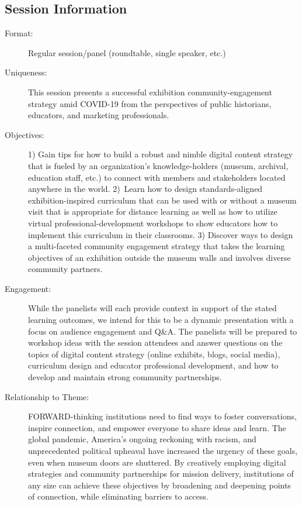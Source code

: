\documentclass{report}
\begin{document}
              \subsection*{Session Information}
                \begin{description}
                  \item [Format:] Regular session/panel (roundtable, single speaker, etc.)
							    
							    \item [Uniqueness:]This session presents a successful exhibition community-engagement strategy amid COVID-19 from the perspectives of public historians, educators, and marketing professionals.
							    \item [Objectives:]1) Gain tips for how to build a robust and nimble digital content strategy that is fueled by an organization’s knowledge-holders (museum, archival, education staff, etc.) to connect with members and stakeholders located anywhere in the world.
2) Learn how to design standards-aligned exhibition-inspired curriculum that can be used with or without a museum visit that is appropriate for distance learning as well as how to utilize virtual professional-development workshops to show educators how to implement this curriculum in their classrooms.
3) Discover ways to design a multi-faceted community engagement strategy that takes the learning objectives of an exhibition outside the museum walls and involves diverse community partners.
							    \item [Engagement:]While the panelists will each provide context in support of the stated learning outcomes, we intend for this to be a dynamic presentation with a focus on audience engagement and Q\&A. The panelists will be prepared to workshop ideas with the session attendees and answer questions on the topics of digital content strategy (online exhibits, blogs, social media), curriculum design and educator professional development, and how to develop and maintain strong community partnerships.
							    \item [Relationship to Theme:]FORWARD-thinking institutions need to find ways to foster conversations, inspire connection, and empower everyone to share ideas and learn. The global pandemic, America’s ongoing reckoning with racism, and unprecedented political upheaval have increased the urgency of these goals, even when museum doors are shuttered. By creatively employing digital strategies and community partnerships for mission delivery, institutions of any size can achieve these objectives by broadening and deepening points of connection, while eliminating barriers to access.
							    
                \end{description}
\end{document}

